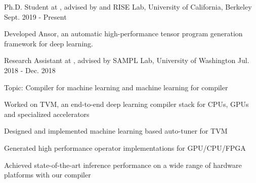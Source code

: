 

\begin{cventries}


\cventry
	{Ph.D. Student at , advised by   and } %
	{RISE Lab, University of California, Berkeley} %
	{Sept. 2019 - Present} %
	{} %
	{
		\begin{cvitems} %
			\item{Developed Ansor, an automatic high-performance tensor program generation framework for deep learning.}
		\end{cvitems}
	}

\cventry
	{Research Assistant at , advised by } %
	{SAMPL Lab, University of Washington} %
	{Jul. 2018 - Dec. 2018} %
	{} %
	{
		\begin{cvitems} %
			\item{Topic: Compiler for machine learning and machine learning for compiler}
			\item {Worked on TVM, an end-to-end deep learning compiler stack for CPUs, GPUs and specialized accelerators
			}
			\item {Designed and implemented machine learning based auto-tuner for TVM}
			\item {Generated high performance operator implementations for GPU/CPU/FPGA}
			\item {Achieved state-of-the-art inference performance on a wide range of hardware platforms with our compiler}
		\end{cvitems}
    }


\end{cventries}
